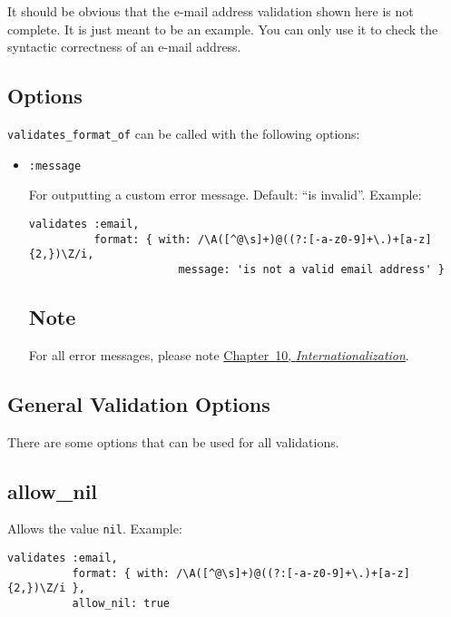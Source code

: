 \documentclass[a4paper]{book}
\begin{document}
It should be obvious that the e-mail address validation shown here is not complete. It is just meant to be an example. You can only use it to check the syntactic correctness of an e-mail address.

\subsection{Options}\label{options-8}

\texttt{validates\_format\_of} can be called with the following options:

\begin{itemize}
\item
  \texttt{:message}

  For outputting a custom error message. Default: “is invalid”. Example:

\begin{shaded}\begin{verbatim}
validates :email,
          format: { with: /\A([^@\s]+)@((?:[-a-z0-9]+\.)+[a-z]{2,})\Z/i,
                       message: 'is not a valid email address' }
\end{verbatim}\end{shaded}

  \subsection{Note}\label{note-31}

  For all error messages, please note \hyperref[i18n]{Chapter~10, \emph{Internationalization}}.
\end{itemize}

\subsection{General Validation Options}\label{general-validation-options}

There are some options that can be used for all validations.

\subsection{allow\_nil}\label{allowux5fnil}

Allows the value \texttt{nil}. Example:

\begin{shaded}\begin{verbatim}
validates :email,
          format: { with: /\A([^@\s]+)@((?:[-a-z0-9]+\.)+[a-z]{2,})\Z/i },
          allow_nil: true
\end{verbatim}\end{shaded}
\end{document}
